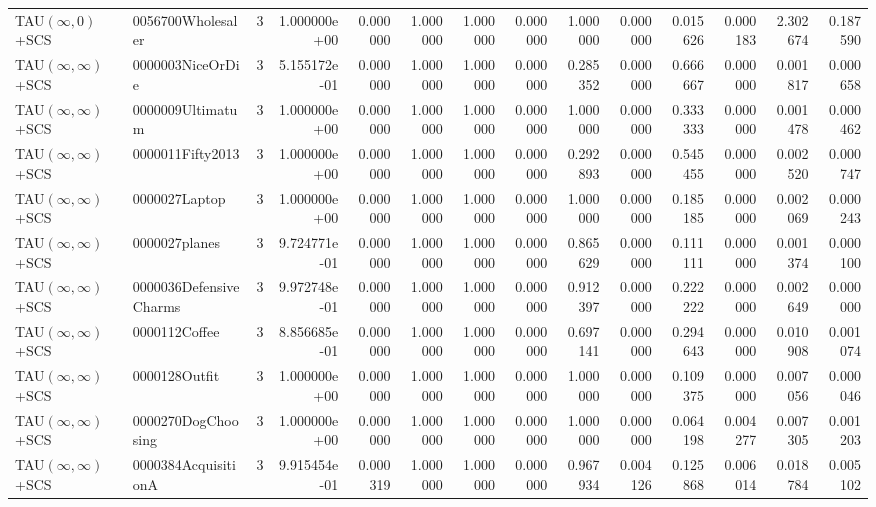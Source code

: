 \begin{tabular}{llrr|r|rr|rr|rr|rrr}
     TAU$(\infty, 0)$+SCS &      0056700Wholesaler &       3 & 1.000000e+00 & 0.000000 & 1.000000 &      1.000000 & 0.000000 &      1.000000 & 0.000000 &      0.015626 &    0.000183 &     2.302674 &    0.187590 \\
TAU$(\infty, \infty)$+SCS &       0000003NiceOrDie &       3 & 5.155172e-01 & 0.000000 & 1.000000 &      1.000000 & 0.000000 &      0.285352 & 0.000000 &      0.666667 &    0.000000 &     0.001817 &    0.000658 \\
TAU$(\infty, \infty)$+SCS &       0000009Ultimatum &       3 & 1.000000e+00 & 0.000000 & 1.000000 &      1.000000 & 0.000000 &      1.000000 & 0.000000 &      0.333333 &    0.000000 &     0.001478 &    0.000462 \\
TAU$(\infty, \infty)$+SCS &       0000011Fifty2013 &       3 & 1.000000e+00 & 0.000000 & 1.000000 &      1.000000 & 0.000000 &      0.292893 & 0.000000 &      0.545455 &    0.000000 &     0.002520 &    0.000747 \\
TAU$(\infty, \infty)$+SCS &          0000027Laptop &       3 & 1.000000e+00 & 0.000000 & 1.000000 &      1.000000 & 0.000000 &      1.000000 & 0.000000 &      0.185185 &    0.000000 &     0.002069 &    0.000243 \\
TAU$(\infty, \infty)$+SCS &          0000027planes &       3 & 9.724771e-01 & 0.000000 & 1.000000 &      1.000000 & 0.000000 &      0.865629 & 0.000000 &      0.111111 &    0.000000 &     0.001374 &    0.000100 \\
TAU$(\infty, \infty)$+SCS & 0000036DefensiveCharms &       3 & 9.972748e-01 & 0.000000 & 1.000000 &      1.000000 & 0.000000 &      0.912397 & 0.000000 &      0.222222 &    0.000000 &     0.002649 &    0.000000 \\
TAU$(\infty, \infty)$+SCS &          0000112Coffee &       3 & 8.856685e-01 & 0.000000 & 1.000000 &      1.000000 & 0.000000 &      0.697141 & 0.000000 &      0.294643 &    0.000000 &     0.010908 &    0.001074 \\
TAU$(\infty, \infty)$+SCS &          0000128Outfit &       3 & 1.000000e+00 & 0.000000 & 1.000000 &      1.000000 & 0.000000 &      1.000000 & 0.000000 &      0.109375 &    0.000000 &     0.007056 &    0.000046 \\
TAU$(\infty, \infty)$+SCS &     0000270DogChoosing &       3 & 1.000000e+00 & 0.000000 & 1.000000 &      1.000000 & 0.000000 &      1.000000 & 0.000000 &      0.064198 &    0.004277 &     0.007305 &    0.001203 \\
TAU$(\infty, \infty)$+SCS &    0000384AcquisitionA &       3 & 9.915454e-01 & 0.000319 & 1.000000 &      1.000000 & 0.000000 &      0.967934 & 0.004126 &      0.125868 &    0.006014 &     0.018784 &    0.005102 \\

\end{tabular}
